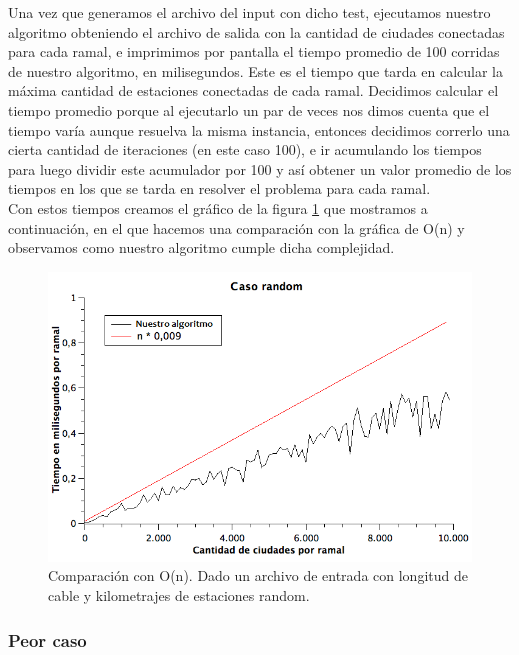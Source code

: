 Una vez que generamos el archivo del input con dicho test, ejecutamos nuestro algoritmo obteniendo el archivo de salida con la cantidad de ciudades conectadas para cada ramal, e imprimimos por pantalla el tiempo promedio de 100 corridas de nuestro algoritmo, en milisegundos. Este es el tiempo que tarda en calcular la máxima cantidad de estaciones conectadas de cada ramal. Decidimos calcular el tiempo promedio porque al ejecutarlo un par de veces nos dimos cuenta que el tiempo varía aunque resuelva la misma instancia, entonces decidimos correrlo una cierta cantidad de iteraciones (en este caso 100), e ir acumulando los tiempos para luego dividir este acumulador por 100 y así obtener un valor promedio de los tiempos en los que se tarda en resolver el problema para cada ramal. \\

Con estos tiempos creamos el gráfico de la figura \ref{ej1-random} que mostramos a continuación, en el que hacemos una comparación con la gráfica de O(n) y observamos como nuestro algoritmo cumple dicha complejidad.

\begin{figure}[H]
\begin{center}

  \includegraphics[width=\linewidth]{../graficos/ej1/CasoRandom.png}
  \caption{{\small Comparación con O(n). Dado un archivo de entrada con longitud de cable y kilometrajes de estaciones random.}} \label{ej1-random}
\endminipage

\end{center}
\end{figure}


\subsubsection{Peor caso}

